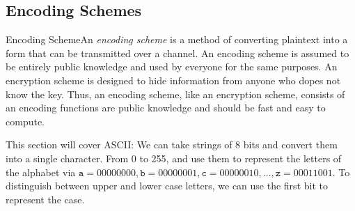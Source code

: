\subsection{Encoding Schemes}

\begin{definition}
    {Encoding Scheme}An \textit{encoding scheme} is a method of converting plaintext into a form that can be transmitted over a channel. An encoding scheme is assumed to be entirely public knowledge and used by everyone for the same purposes. An encryption scheme is designed to hide information from anyone who dopes not know the key. Thus, an encoding scheme, like an encryption scheme, consists of an encoding functions are public knowledge and should be fast and easy to compute.
\end{definition}

This section will cover ASCII\@: We can take strings of 8 bits and convert them into a single character. From 0 to 255, and use them to represent the letters of the alphabet via \(\texttt{a} = 00000000, \texttt{b} = 00000001, \texttt{c} = 00000010, \dots, \texttt{z} = 00011001\). To distinguish between upper and lower case letters, we can use the first bit to represent the case.